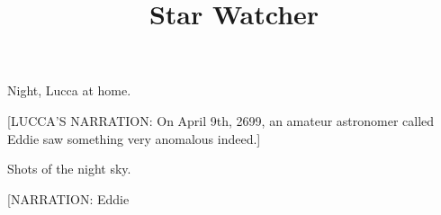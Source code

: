 \documentclass[11pt]{article}
\begin{document}
\ttfamily
\title{Star Watcher}
\maketitle

Night, Lucca at home. 

[LUCCA'S NARRATION: On April 9th, 2699, an amateur astronomer called Eddie saw something very anomalous indeed.]

Shots of the night sky.

[NARRATION: Eddie 
\end{document}
